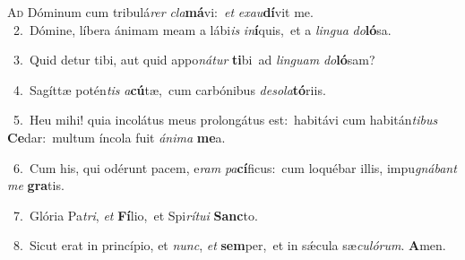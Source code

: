 \lettrine{\initial\textcolor{\initialcolor}{A}}{d} Dóminum cum tribulá\textit{rer} \textit{cla}\-\textbf{má}vi:~\star \textit{et} \textit{ex}\-\textit{au}\textbf{dí}vit me.\\
{\numbfont\textcolor{\numbcolor}{~2.}}~Dómine, líbera ánimam meam a lábi\textit{is} \textit{in}\-\textbf{í}quis,~\star et a \textit{lin}\-\textit{gua} \textit{do}\-\textbf{ló}sa.\par
{\numbfont\textcolor{\numbcolor}{~3.}}~Quid detur tibi, aut quid appo\-\textit{ná}\-\textit{tur} \textbf{ti}\-bi~\star ad \textit{lin}\-\textit{guam} \textit{do}\-\textbf{ló}sam?\par
{\numbfont\textcolor{\numbcolor}{~4.}}~Sagíttæ potén\textit{tis} \textit{a}\-\textbf{cú}tæ,~\star cum carbónibus \textit{de}\-\textit{so}\textit{la}\textbf{tó}riis.\par
{\numbfont\textcolor{\numbcolor}{~5.}}~Heu mihi! quia incolátus meus prolongátus est:~\dagger habitávi cum habitán\-\textit{ti}\-\textit{bus} \textbf{Ce}\-dar:~\star multum íncola fuit \textit{á}\-\textit{ni}\textit{ma} \textbf{me}\-a.\par
{\numbfont\textcolor{\numbcolor}{~6.}}~Cum his, qui odérunt pacem, e\textit{ram} \textit{pa}\-\textbf{cí}ficus:~\star cum loquébar illis, impu\-\textit{gná}\-\textit{bant} \textit{me} \textbf{gra}\-tis.\par
{\numbfont\textcolor{\numbcolor}{~7.}}~Glória Pa\-\textit{tri}\-, \textit{et} \textbf{Fí}\-lio,~\star et Spi\-\textit{rí}\-\textit{tu}\textit{i} \textbf{Sanc}\-to.\par
{\numbfont\textcolor{\numbcolor}{~8.}}~Sicut erat in princípio, et \textit{nunc}\-, \textit{et} \textbf{sem}\-per,~\star et in sǽcula sæ\-\textit{cu}\-\textit{ló}\textit{rum}. \textbf{A}\-men.\par
